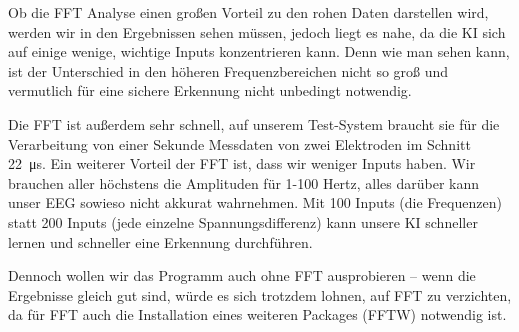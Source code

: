 \documentclass[11pt]{scrartcl}
\begin{document}
	\begin{figure}[H]
	\end{figure}
	
	Ob die FFT Analyse einen großen Vorteil zu den rohen Daten darstellen wird, werden wir in den Ergebnissen sehen müssen, jedoch liegt es nahe, da die KI sich auf einige wenige, wichtige Inputs konzentrieren kann. Denn wie man sehen kann, ist der Unterschied in den höheren Frequenzbereichen nicht so groß und vermutlich für eine sichere Erkennung nicht unbedingt notwendig.

	Die FFT ist außerdem sehr schnell, auf unserem Test-System braucht sie für die Verarbeitung von einer Sekunde Messdaten von zwei Elektroden im Schnitt \qty{22}{\micro\second}. Ein weiterer Vorteil der FFT ist, dass wir weniger Inputs haben. Wir brauchen aller höchstens die Amplituden für 1-100 Hertz, alles darüber kann unser EEG sowieso nicht akkurat wahrnehmen. Mit 100 Inputs (die Frequenzen) statt 200 Inputs (jede einzelne Spannungsdifferenz) kann unsere KI schneller lernen und schneller eine Erkennung durchführen.

	Dennoch wollen wir das Programm auch ohne FFT ausprobieren -- wenn die Ergebnisse gleich gut sind, würde es sich trotzdem lohnen, auf FFT zu verzichten, da für FFT auch die Installation eines weiteren Packages (FFTW) notwendig ist. 
\end{document}
